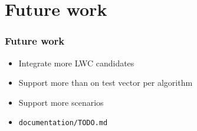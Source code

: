 \documentclass[english]{beamer}
\begin{document}
\section[Future work]{Future work}

\begin{frame}
  \frametitle{Future work}

  \begin{itemize}
  \item Integrate more LWC candidates
  \item Support more than on test vector per algorithm
  \item Support more scenarios
  \item \texttt{documentation/TODO.md}
  \end{itemize}

\end{frame}
\end{document}
